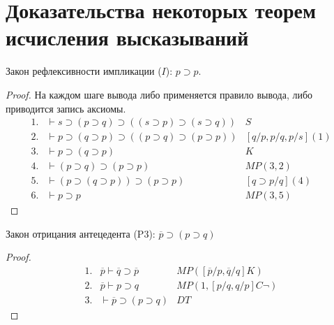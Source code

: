 \section{Доказательства некоторых теорем исчисления высказываний}

\begin{propthm}\label{Theorem:I}
    Закон рефлексивности импликации \textnormal{($I$)}: $p\supset p$.
\end{propthm}
\begin{proof}
    На каждом шаге вывода либо применяется правило вывода, либо приводится запись аксиомы.
    \begin{equation*}
        \begin{array}{lll}
            1. & \vdash s \supset (p \supset q) \supset ((s \supset p) \supset (s \supset q)) & S \\
            2. & \vdash p \supset (q \supset p) \supset ((p \supset q) \supset (p \supset p)) & [q/p,p/q,p/s](1) \\
            3. & \vdash p \supset (q \supset p) & K \\
            4. & \vdash (p \supset q) \supset (p \supset p) & MP(3,2) \\
            5. & \vdash (p \supset (q\supset p)) \supset (p \supset p) & [q\supset p/q](4) \\
            6. & \vdash p \supset p & MP(3,5)
        \end{array}
    \end{equation*}
\end{proof}

\begin{propthm}\label{Theorem:P3-upgrade}
    Закон отрицания антецедента (P3): $\overline{p} \supset (p \supset q)$
\end{propthm}
\begin{proof}
    \begin{equation*}
        \begin{array}{lll}
            1. & \overline{p} \vdash \overline{q} \supset \overline{p} & MP([\overline{p}/p, \overline{q}/q]K) \\ 
            2. & \overline{p} \vdash p \supset q & MP(1, [p/q, q/p]C\lnot) \\ 
            3. & \vdash \overline{p} \supset (p \supset q) & DT
        \end{array}
    \end{equation*}
\end{proof}


